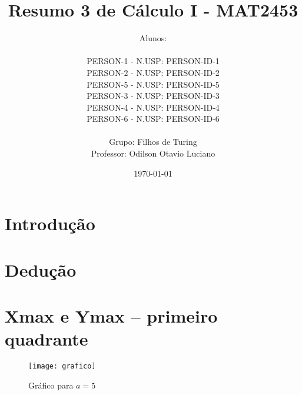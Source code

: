 \documentclass[12pt, a4paper]{article}
\title{
	Resumo 3 de Cálculo I - MAT2453
}
\author{
	Alunos:
	\\  
	\\ {{PERSON-1}} - N.USP: {{PERSON-ID-1}}
	\\ {{PERSON-2}} - N.USP: {{PERSON-ID-2}}
	\\ {{PERSON-5}} - N.USP: {{PERSON-ID-5}}
	\\ {{PERSON-3}} - N.USP: {{PERSON-ID-3}}
	\\ {{PERSON-4}} - N.USP: {{PERSON-ID-4}}
	\\ {{PERSON-6}} - N.USP: {{PERSON-ID-6}}
	\\ \\
	Grupo: Filhos de Turing
	\\ Professor: Odilson Otavio Luciano
}
\date{\today}
\begin{document}
	\maketitle
	\thispagestyle{empty}
	\newpage

	\clearpage
	\thispagestyle{empty}
	\hfill
	\clearpage

	\tableofcontents
	
	\newpage

	\section{Introdução}

	
	\newpage

	\section{Dedução}

	
	\newpage

	\section{Xmax e Ymax – primeiro quadrante}

	
	\newpage

	\begin{figure}[H]
			\centering
			\texttt{[image: grafico]}
			\caption{Gráfico para $a = 5$}
	\end{figure}
\end{document}
